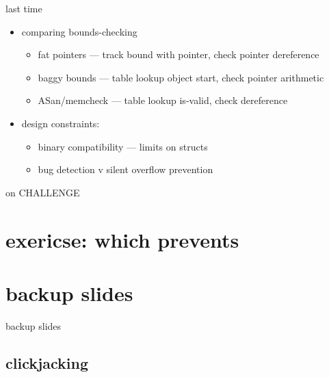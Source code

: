 \date{}
\title{}
\date{}
\usepackage[outputdir=latex.out]{minted}

\begin{frame}
    \titlepage
\end{frame}



\begin{frame}{last time}
    \begin{itemize}
    \item comparing bounds-checking
        \begin{itemize}
        \item fat pointers --- track bound with pointer, check pointer dereference
        \item baggy bounds --- table lookup object start, check pointer arithmetic
        \item ASan/memcheck --- table lookup is-valid, check dereference
        \end{itemize}
    \item design constraints:
        \begin{itemize}
        \item binary compatibility  --- limits on structs
        \item bug detection v silent overflow prevention
        \end{itemize}
    \end{itemize}
\end{frame}

\begin{frame}{on CHALLENGE}
\end{frame}

\section{exericse: which prevents}






\section{backup slides}
\begin{frame}{backup slides}
\end{frame}





\subsection{clickjacking}



